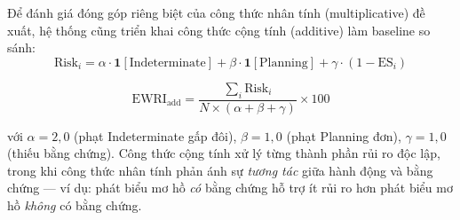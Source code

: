 Để đánh giá đóng góp riêng biệt của công thức nhân tính (multiplicative) đề xuất, hệ thống cũng triển khai công thức cộng tính (additive) làm baseline so sánh:
\begin{equation}
    \text{Risk}_i = \alpha \cdot \mathbf{1}[\text{Indeterminate}] + \beta \cdot \mathbf{1}[\text{Planning}] + \gamma \cdot (1 - \text{ES}_i)
    \label{eq:additive_ewri}
\end{equation}

\begin{equation}
    \text{EWRI}_{\text{add}} = \frac{\sum_i \text{Risk}_i}{N \times (\alpha + \beta + \gamma)} \times 100
    \label{eq:additive_ewri_agg}
\end{equation}

\noindent với $\alpha = 2{,}0$ (phạt Indeterminate gấp đôi), $\beta = 1{,}0$ (phạt Planning đơn), $\gamma = 1{,}0$ (thiếu bằng chứng). Công thức cộng tính xử lý từng thành phần rủi ro độc lập, trong khi công thức nhân tính phản ánh sự \textit{tương tác} giữa hành động và bằng chứng --- ví dụ: phát biểu mơ hồ \textit{có} bằng chứng hỗ trợ ít rủi ro hơn phát biểu mơ hồ \textit{không} có bằng chứng.
